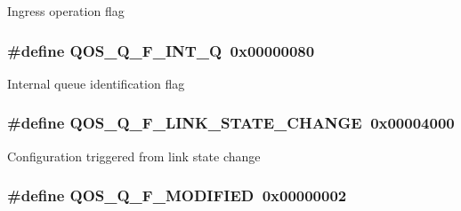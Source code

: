 Ingress operation flag \hypertarget{group__FAPI__QOS__QUEUE_ga3ff77637a60ecb38f8b370157f43ac4a}{
\subsubsection[{Q\-O\-S\-\_\-\-Q\-\_\-\-F\-\_\-\-I\-N\-T\-\_\-\-Q}]{\setlength{\rightskip}{0pt plus 5cm}\#define Q\-O\-S\-\_\-\-Q\-\_\-\-F\-\_\-\-I\-N\-T\-\_\-\-Q~0x00000080}}\label{group__FAPI__QOS__QUEUE_ga3ff77637a60ecb38f8b370157f43ac4a}
Internal queue identification flag \hypertarget{group__FAPI__QOS__QUEUE_ga30f059995ac6786208d944eb84f39fef}{
\subsubsection[{Q\-O\-S\-\_\-\-Q\-\_\-\-F\-\_\-\-L\-I\-N\-K\-\_\-\-S\-T\-A\-T\-E\-\_\-\-C\-H\-A\-N\-G\-E}]{\setlength{\rightskip}{0pt plus 5cm}\#define Q\-O\-S\-\_\-\-Q\-\_\-\-F\-\_\-\-L\-I\-N\-K\-\_\-\-S\-T\-A\-T\-E\-\_\-\-C\-H\-A\-N\-G\-E~0x00004000}}\label{group__FAPI__QOS__QUEUE_ga30f059995ac6786208d944eb84f39fef}
Configuration triggered from link state change \hypertarget{group__FAPI__QOS__QUEUE_ga34dba99f30e84ea75cab31c31f353fdf}{
\subsubsection[{Q\-O\-S\-\_\-\-Q\-\_\-\-F\-\_\-\-M\-O\-D\-I\-F\-I\-E\-D}]{\setlength{\rightskip}{0pt plus 5cm}\#define Q\-O\-S\-\_\-\-Q\-\_\-\-F\-\_\-\-M\-O\-D\-I\-F\-I\-E\-D~0x00000002}}\label{group__FAPI__QOS__QUEUE_ga34dba99f30e84ea75cab31c31f353fdf}
